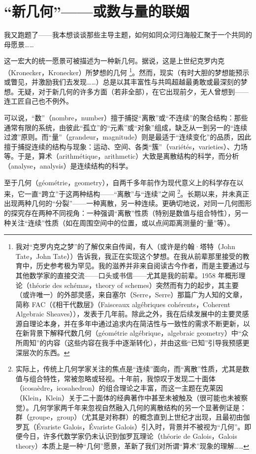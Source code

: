 \section{“新几何”——或数与量的联姻}

我又跑题了——我本想谈谈那些主导主题，如何如同众河归海般汇聚于一个共同的母愿景……

这一宏大的统一愿景可被描述为一种新几何。据说，这是上世纪克罗内克（Kronecker，Kronecker）所梦想的几何 \footnote{我对“克罗内克之梦”的了解仅来自传闻，有人（或许是约翰·塔特（John Tate，John Tate））告诉我，我正在实现这个梦想。在我从前辈那里接受的教育中，历史参考极为罕见。我的滋养并非来自阅读古今作者，而是主要通过与其他数学家的直接交流——口头或书信——尤其是我的前辈。1958 年概形理论（théorie des schémas，theory of schemes）突然而有力的起步，其主要（或许唯一）的外部灵感，来自塞尔（Serre，Serre）那篇广为人知的文章，简称 FAC（《相干代数层》（Faisceaux algébriques cohérents，Coherent Algebraic Sheaves）），发表于几年前。除此之外，我在后续发展中的主要灵感源自理论本身，并在多年中通过追求内在简洁性与一致性的需求不断更新，以在新背景下解释代数几何（géométrie algébrique，algebraic geometry）中“众所周知”的内容（这些内容在我手中逐渐转化），并由这些“已知”引导我预感更深层次的东西。}。然而，现实（有时大胆的梦想能预示或瞥见，并激励我们去发现……）总是以其丰富性与共鸣超越最勇敢或最深刻的梦想。无疑，对于新几何的许多方面（若非全部），在它出现前夕，无人曾想到——连工匠自己也不例外。

可以说，“数”（nombre，number）擅于捕捉“离散”或“不连续”的聚合结构：那些通常有限的系统，由彼此“孤立”的“元素”或“对象”组成，缺乏从一到另一的“连续过渡”原则。而“量”（grandeur，magnitude）则是最适于“连续变化”的品质，因此擅于捕捉连续的结构与现象：运动、空间、各类“簇”（variétés，varieties）、力场等。于是，算术（arithmétique，arithmetic）大致是离散结构的科学，而分析（analyse，analysis）是连续结构的科学。

至于几何（géométrie，geometry），自两千多年前作为现代意义上的科学存在以来，它一直“跨立”于这两种结构——“离散”与“连续”之间 \footnote{实际上，传统上几何学家关注的焦点是“连续”面向，而“离散”性质，尤其是数值与组合特性，常被忽略或轻视。十年前，我惊叹于发现二十面体（icosaèdre，icosahedron）的组合理论之丰富，而这一主题在克莱因（Klein，Klein）关于二十面体的经典著作中甚至未被触及（很可能也未被察觉）。几何学家两千年来忽视自然融入几何的离散结构的另一个显著例证是：群（groupe，group）（尤其是对称群）的概念直到上世纪才出现，且最初由伽罗瓦（Évariste Galois，Évariste Galois）引入时，背景并不被视为“几何”。即便今日，许多代数学家仍未认识到伽罗瓦理论（théorie de Galois，Galois theory）本质上是一种“几何”愿景，革新了我们对所谓“算术”现象的理解……}。长期以来，并未真正出现两种几何的“分裂”——一种离散，另一种连续。更确切地说，对同一几何图形的探究存在两种不同视角：一种强调“离散”性质（特别是数值与组合特性），另一种关注“连续”性质（如在周围空间中的位置，或以点间距离测量的“量”等）。

